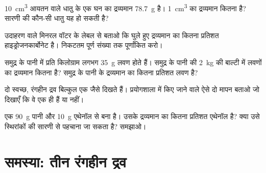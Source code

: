 \begin{exercise}[$\star\star$]\label{exo:g6:pure-substances-and-mixtures:8}
\qty{10}{cm^3} आयतन वाले धातु के एक घन का द्रव्यमान \qty{78.7}{g} है।
\qty{1}{cm^3} का द्रव्यमान कितना है? सारणी की कौन-सी धातु यह हो सकती है?
\end{exercise}

\begin{exercise}[$\star\star$]\label{exo:g6:pure-substances-and-mixtures:9}
उदाहरण वाले मिनरल वॉटर के लेबल से बताओ कि घुले हुए द्रव्यमान का कितना
प्रतिशत हाइड्रोजनकार्बोनेट है। निकटतम पूर्ण संख्या तक पूर्णांकित करो।
\end{exercise}

\begin{exercise}[$\star\star$]\label{exo:g6:pure-substances-and-mixtures:10}
समुद्र के पानी में प्रति किलोग्राम लगभग \qty{35}{g} लवण होते हैं। समुद्र के
पानी की \qty{2}{kg} की बाल्टी में लवणों का द्रव्यमान कितना है? समुद्र के पानी
के द्रव्यमान का कितना प्रतिशत लवण है?
\end{exercise}

\begin{exercise}[$\star\star\star$]\label{exo:g6:pure-substances-and-mixtures:11}
दो स्वच्छ, रंगहीन द्रव बिल्कुल एक जैसे दिखते हैं। प्रयोगशाला में किए जाने
वाले ऐसे दो मापन बताओ जो दिखाएँ कि वे एक ही  हैं
या नहीं।
\end{exercise}

\begin{exercise}[$\star\star\star$]\label{exo:g6:pure-substances-and-mixtures:12}
एक  \qty{90}{g} पानी और \qty{10}{g} एथेनॉल से बना है। उसके
द्रव्यमान का कितना प्रतिशत एथेनॉल है? क्या उसे स्थिरांकों की सारणी से पहचाना
जा सकता है? समझाओ।
\end{exercise}

\section{समस्या: तीन रंगहीन द्रव}


